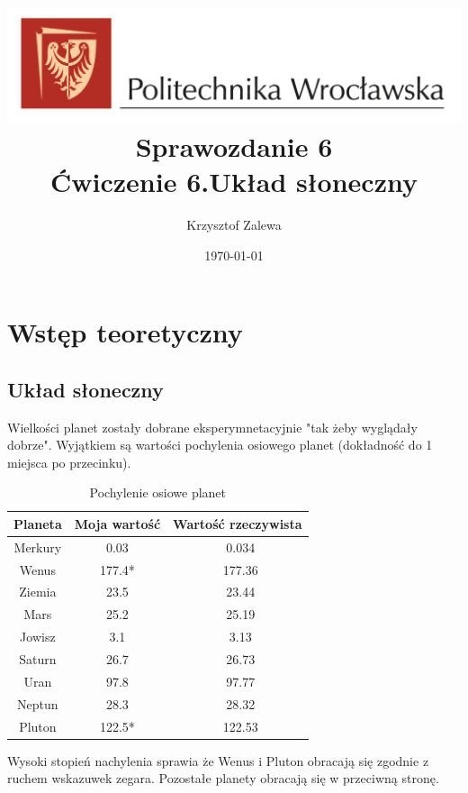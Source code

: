\documentclass{article}
\title{
  \centering
  \includegraphics[width=\textwidth]{images/logo_PWr_kolor_poziom.png}\\
  \fontsize{28pt}{30pt}\selectfont Sprawozdanie 6\\
  \fontsize{14pt}{30pt}\selectfont Ćwiczenie 6.Układ słoneczny}
\author{Krzysztof Zalewa}
\date{\daymonthyear\today}
\begin{document}
    \maketitle
    \pagebreak
    \tableofcontents
    \FloatBarrier
    \section{Wstęp teoretyczny}
        \subsection{Układ słoneczny}
            Wielkości planet zostały dobrane eksperymnetacyjnie "tak żeby wyglądały dobrze". Wyjątkiem
            są wartości pochylenia osiowego planet (dokładność do 1 miejsca po przecinku).
            \begin{table}[ht]
                \centering
                \begin{tabular}{|c|c|c|}
                    \hline
                    Planeta & Moja wartość & Wartość rzeczywista \\ \hline
                    Merkury & 0.03      & ~0.034      \\ \hline
                    Wenus   & 177.4*    & ~177.36    \\ \hline
                    Ziemia  & 23.5      & ~23.44     \\ \hline 
                    Mars    & 25.2      & ~25.19     \\ \hline
                    Jowisz  & 3.1       & ~3.13      \\ \hline
                    Saturn  & 26.7      & ~26.73     \\ \hline
                    Uran    & 97.8      & ~97.77     \\ \hline
                    Neptun  & 28.3      & ~28.32     \\ \hline
                    Pluton  & 122.5*    & ~122.53    \\ \hline
                \end{tabular}
                \caption{Pochylenie osiowe planet}
                \label{tab:axial_tilt}
            \end{table}
            \* Wysoki stopień nachylenia sprawia że Wenus i Pluton obracają się 
            zgodnie z ruchem wskazuwek zegara. Pozostałe planety obracają się
            w przeciwną stronę.
\end{document}
